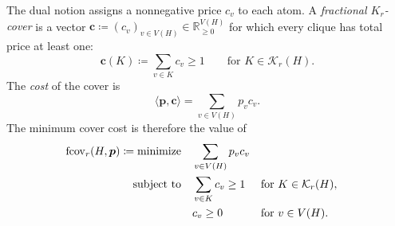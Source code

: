 \documentclass[10pt]{article}
\numberwithin{equation}{section}
\newcommand{\fcov}{\operatorname{fcov}}
\newcommand{\vct}[1]{\boldsymbol{#1}}
\newcommand{\R}{\mathbb R}
\begin{document}
The dual notion assigns a nonnegative price $c_v$ to each atom.  A \emph{fractional $K_r$-cover} is a vector $\vct c\coloneqq(c_v)_{v\in V(H)}\in\R_{\ge0}^{V(H)}$ for which every clique has total price at least one:
\[
 \vct c(K)\coloneqq\sum_{v\in K}c_v\ge1
 \qquad\text{for }K\in\mathcal K_r(H).
\]
The \emph{cost} of the cover is
\[
 \langle\vct p,\vct c\rangle=\sum_{v\in V(H)}p_vc_v.
\]
The minimum cover cost is therefore the value of
\begin{equation}\label{eq:weighted-cover-lp}
\begin{aligned}
 \fcov_r(H,\vct p)\coloneqq\text{\rm minimize}\quad
   &\sum_{v\in V(H)}p_vc_v\\
 \text{\rm subject to}\quad
   &\sum_{v\in K}c_v\ge1
       &&\text{for }K\in\mathcal K_r(H),\\
   &c_v\ge0
       &&\text{for }v\in V(H).
\end{aligned}
\end{equation}
\end{document}
